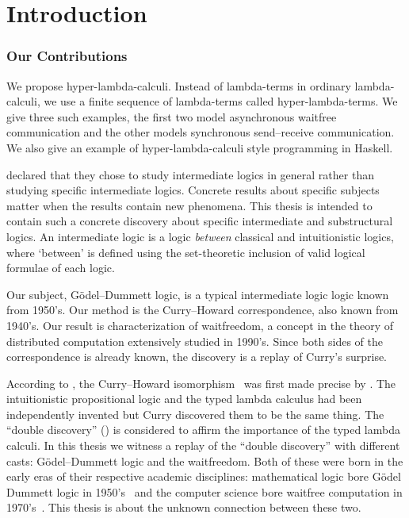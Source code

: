 \chapter{Introduction}

\subsection{Our Contributions}

We propose hyper-lambda-calculi.
Instead of lambda-terms in ordinary lambda-calculi,
we use a finite sequence of lambda-terms called hyper-lambda-terms.
We give three such examples, the first two model asynchronous waitfree
communication and
the other models synchronous send--receive communication.
We also give an example of hyper-lambda-calculi style programming in Haskell.

\citet{hosoi-ono} declared that they chose to study intermediate
logics in
general rather than studying specific intermediate logics.
Concrete results about specific subjects matter when the results
contain new phenomena.
This thesis is intended to contain such a concrete discovery
about specific intermediate and substructural logics.
An intermediate logic is a logic \textit{between} classical and
intuitionistic logics, where `between' is defined using the
set-theoretic inclusion of valid logical formulae of each logic.

Our subject, G\"odel--Dummett logic, is
a typical intermediate logic logic known from 1950's.
Our method is the Curry--Howard correspondence, also known from 1940's.
Our result is characterization of waitfreedom, a concept in the theory
of distributed computation extensively studied in 1990's.
Since both sides of the correspondence is already known,
the discovery is a replay of Curry's surprise.

According to \citet[p.97]{curryhoward},
the Curry--Howard isomorphism~\citep{curryhoward} was first made
precise by \citet[\textbf{9}E and
\textbf{9}F]{curry1974combinatory}.
The intuitionistic propositional logic and the typed lambda calculus
had been independently invented but Curry discovered them to be the same thing.
The ``double discovery'' (\citet{wadler2012propositions}) is considered
to affirm the importance of the typed lambda calculi.
In this thesis we witness a replay of the ``double discovery'' with
different casts: G\"odel--Dummett logic and the waitfreedom.
Both of these were born in the early eras of their respective academic
disciplines:
mathematical logic bore G\"odel Dummett logic in
1950's~\citep{dummett59}
and the computer science bore waitfree computation in
1970's~\citep{lamport1979make}.
This thesis is about the unknown connection between these two.

